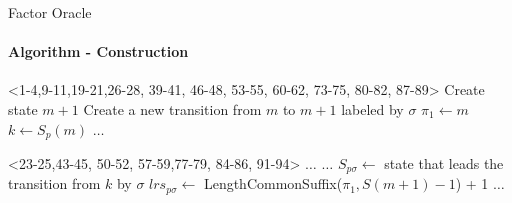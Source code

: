 \begin{frame}[fragile]{Factor Oracle}
  \framesubtitle{Algorithm - Construction}
  \vspace{-0.5cm}
  \begin{minipage}[t][4.5cm][t]{\textwidth}
    \begin{algorithm}[H]
      \caption{Incremental update of Factor Oracle}\label{alg:addletter}
      \begin{algorithmic}[1]

        \only<1-4,9-11,19-21,26-28, 39-41, 46-48, 53-55, 60-62, 73-75,
        80-82, 87-89>{%
          \State Create state $m+1$
          \State Create a new transition from $m$ to $m+1$ labeled by
          $\sigma$ 
          \State $\pi_{1} \gets m$
          \State $k \gets S_{p}(m)$
          \State $\dots$
        }



        \only<23-25,43-45, 50-52, 57-59,77-79,
        84-86, 91-94>{
          \State $\dots$
          \State $\dots$
          \Else
          \State $S_{p\sigma}\gets $ state that leads the transition
          from $k$ by $\sigma$
          \State $lrs_{p\sigma} \gets $ LengthCommonSuffix($\pi_{1},S(m+1)-1$) + 1
          \EndIf
          \State $\dots$
        }



\end{algorithmic}
\end{algorithm}
\end{minipage}
\end{frame}
